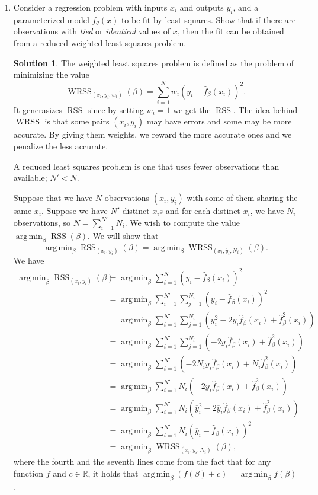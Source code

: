 \documentclass[]{book}
\theoremstyle{definition}
\newtheorem*{soln}{Solution}
\DeclareMathOperator*{\argmin}{arg\,min} \DeclareMathOperator*{\Cov}{Cov}
\DeclareMathOperator*{\RSS}{RSS} \DeclareMathOperator*{\WRSS}{WRSS}
\begin{document}
\begin{enumerate}
	\item\label{ex:2.6} Consider a regression problem with inputs $x_i$ and
	outputs $y_i$, and a parameterized model $f_\theta(x)$ to be fit by least
	squares. Show that if there are observations with \emph{tied} or
	\emph{identical} values of $x$, then the fit can be obtained from a reduced
	weighted least squares problem.

	\begin{soln}
		The weighted least squares problem is defined as the problem of
		minimizing the value
		\[\WRSS\nolimits_{(x_i,y_i,w_i)}(\beta)=\sum_{i=1}^Nw_i(y_i-\hat
			f_\beta(x_i))^2.\] It generasizes $\RSS$ since by setting $w_i=1$ we
		get the $\RSS$. The idea behind $\WRSS$ is that some pairs
		$(x_i,y_i)$ may have errors and some may be more accurate. By giving
		them weights, we reward the more accurate ones and we penalize the
		less accurate.

		A reduced least squares problem is one that uses fewer observations than
		available; $N'<N$.

		Suppose that we have $N$ observations $(x_i,y_i)$ with some of them
		sharing the same $x_i$. Suppose we have $N'$ distinct $x_i$s and for
		each distinct $x_i$, we have $N_i$ observations, so
		$N=\sum_{i=1}^{N'}N_i$. We wish to compute the value $\argmin_\beta
			\RSS(\beta)$. We will show that
		\[\argmin_\beta \RSS\nolimits_{(x_i,y_i)}(\beta)=\argmin_\beta
			\WRSS\nolimits_{(x_i,\overline y_i,N_i)}(\beta).\] We have{
				\newcommand{\fx}{\hat f_\beta(x_i)}
				\newcommand{\fs}{\hat f^2_\beta(x_i)}
				\begin{equation}
					\begin{split}
						\argmin_\beta \RSS\nolimits_{(x_i,y_i)}(\beta) &=
						\argmin_\beta\sum_{i=1}^N(y_i-\fx)^2 \\
						&= \argmin_\beta\sum_{i=1}^{N'}\sum_{j=1}^{N_i}(y_i-\fx)^2 \\
						&= \argmin_\beta\sum_{i=1}^{N'}\sum_{j=1}^{N_i}(y_i^2-2y_i\fx + \fs) \\
						&= \argmin_\beta\sum_{i=1}^{N'}\sum_{j=1}^{N_i}(-2y_i\fx + \fs) \\
						&= \argmin_\beta\sum_{i=1}^{N'}(-2N_i\overline y_i\fx + N_i\fs)\\
						&= \argmin_\beta\sum_{i=1}^{N'}N_i(-2\overline y_i\fx + \fs)\\
						&= \argmin_\beta\sum_{i=1}^{N'}N_i(\overline y_i^2-2\overline y_i\fx + \fs)\\
						&= \argmin_\beta\sum_{i=1}^{N'}N_i(\overline y_i-\fx)^2 \\
						&= \argmin_\beta\WRSS\nolimits_{(x_i,\overline y_i,N_i)}(\beta),
					\end{split}
				\end{equation}}
		where the fourth and the seventh lines come from the fact that for any
		function $f$ and $c\in\mathbb R$, it holds that $\argmin_\beta
			(f(\beta)+c)=\argmin_\beta{f(\beta)}$.
	\end{soln}


\end{enumerate}
\end{document}
